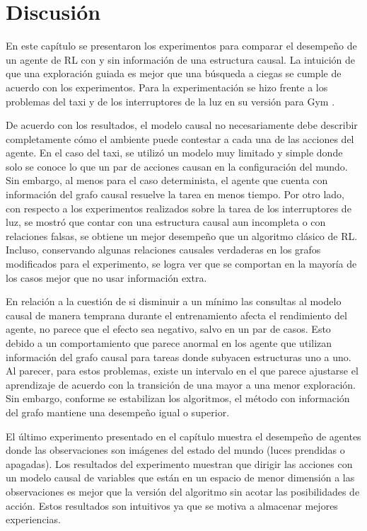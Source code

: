 \section{Discusión}

En este capítulo se presentaron los experimentos para comparar  el desempeño de un agente de RL con y sin información de una estructura causal. La intuición de que una exploración guiada es mejor que una búsqueda a ciegas se cumple de acuerdo 
con los experimentos. 
Para la experimentación se hizo frente a los problemas del taxi \cite{Dietterich:2000:HRL:1622262.1622268} y de los interruptores de la luz \cite{nair2019causal} en su versión para Gym \cite{gym2016brockman}.

De acuerdo con los resultados, el modelo causal no necesariamente debe describir completamente cómo el ambiente puede contestar a cada una de las acciones del agente.
En el caso del taxi, se utilizó un modelo muy limitado y simple donde
solo se conoce lo que un par de acciones causan en la configuración del mundo. Sin embargo, al menos para el caso determinista,
el agente que cuenta con información del grafo causal resuelve la tarea en menos tiempo. Por otro lado, con respecto a los experimentos realizados sobre la tarea
de los interruptores de luz, se mostró que contar con una estructura causal aun incompleta o con relaciones falsas, se obtiene un mejor desempeño que un algoritmo 
clásico de RL. Incluso, conservando algunas relaciones causales verdaderas en los grafos modificados para el experimento, se logra ver que se comportan en la mayoría de los casos mejor que no usar información extra.

En relación a la cuestión de si disminuir a un mínimo las consultas al modelo causal de manera temprana durante el entrenamiento afecta el rendimiento del agente, no 
parece que el efecto sea negativo, salvo en un par de casos. Esto debido a un comportamiento que parece anormal en los agente que utilizan información del grafo causal para tareas donde subyacen estructuras uno a uno. Al parecer, para estos problemas, existe un intervalo en el que parece 
ajustarse el aprendizaje de acuerdo con la transición de una mayor a una menor exploración. Sin embargo, conforme se estabilizan los algoritmos, el método con información del grafo mantiene una desempeño igual o superior.

El último experimento presentado en el capítulo muestra el desempeño
de agentes donde las observaciones son imágenes del estado del mundo (luces prendidas o apagadas). Los resultados del experimento muestran que dirigir las acciones
con un modelo causal de variables que están en un espacio
de menor dimensión a las observaciones es mejor que la versión del algoritmo sin 
acotar las posibilidades de acción. Estos resultados son intuitivos ya que 
se motiva a almacenar mejores experiencias.

